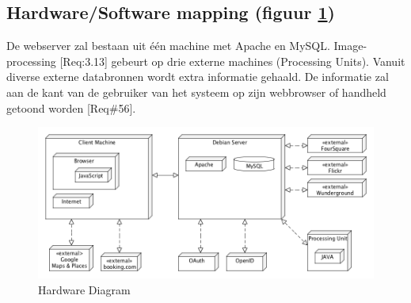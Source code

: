 \documentclass[a4paper,10pt]{article}
\begin{document}
	\subsection{Hardware/Software mapping (figuur \ref{hardwarediagram})}
	De webserver zal bestaan uit \'e\'en machine met Apache en MySQL. Image-processing [Req:3.13] gebeurt op drie externe machines (Processing Units). Vanuit diverse externe databronnen wordt extra informatie gehaald. De informatie zal aan de kant van de gebruiker van het systeem op zijn webbrowser of handheld getoond worden [Req\#56].
	\begin{figure}[ht!]
	\centering
	\includegraphics[width=15cm]{hardwareDiagram.png}
	\caption{Hardware Diagram \label{hardwarediagram}}
	\end{figure}
	
\end{document}
